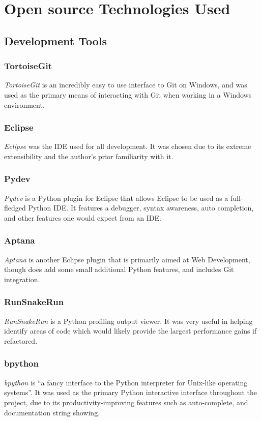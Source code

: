 \documentclass[a4paper,11pt]{report}
\begin{document}
\section{Open source Technologies Used}
\subsection{Development Tools}
\subsubsection*{TortoiseGit}
\emph{TortoiseGit} \citep{prog:tortoisegit} is an incredibly easy to use interface to Git on Windows, and was used as the primary means of interacting with Git when working in a Windows environment.

\subsubsection*{Eclipse}
\emph{Eclipse} \citep{prog:eclipse} was the IDE used for all development. It was chosen due to its extreme extensibility and the author's prior familiarity with it.

\subsubsection*{Pydev}
\emph{Pydev} \citep{prog:pydev} is a Python plugin for Eclipse that allows Eclipse to be used as a full-fledged Python IDE. It features a debugger, syntax awareness, auto completion, and other features one would expect from an IDE.

\subsubsection*{Aptana}
\emph{Aptana} \citep{prog:aptana} is another Eclipse plugin that is primarily aimed at Web Development, though does add some small additional Python features, and includes Git integration.

\subsubsection*{RunSnakeRun}
\emph{RunSnakeRun} \citep{prog:runsnakerun} is a Python profiling output viewer. It was very useful in helping identify areas of code which would likely provide the largest performance gains if refactored.

\subsubsection*{bpython}
\emph{bpython} \citep{prog:bpython} is ``a fancy interface to the Python interpreter for Unix-like operating systems''. It was used as the primary Python interactive interface throughout the project, due to its productivity-improving features such as auto-complete, and documentation string showing.
\end{document}
